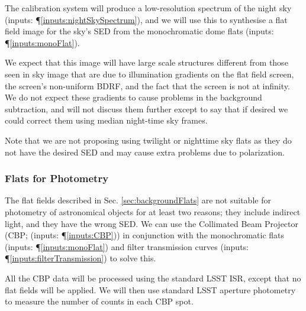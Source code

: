 \documentclass[12pt]{article}
\newcommand{\inputData}[1]{(inputs: \P \ref{inputs:#1})}
\newcommand{\secRef}[1]{Sec. \ref{sec:#1}}
\begin{document}
The calibration system will produce a low-resolution spectrum of the night sky \inputData{nightSkySpectrum},
and we will use this to synthesise a flat field image for the sky's SED from the monochromatic dome flats
\inputData{monoFlat}.

We expect that this image will have large scale structures different from those seen in sky image
that are due to illumination gradients on the flat field screen, the screen's non-uniform BDRF, and
the fact that the screen is not at infinity.  We do not expect these gradients to cause problems in
the background subtraction, and will not discuss them further except to say that if desired we could
correct them using median night-time sky frames.

Note that we are not proposing using twilight or nighttime sky flats as they do not have the desired
SED and may cause extra problems due to polarization.

\subsubsection{Flats for Photometry}
\label{sec:photometricFlats}

The flat fields described in \secRef{backgroundFlats} are not suitable for photometry of astronomical
objects for at least two reasons;  they include indirect light, and they have the wrong SED.  We can
use the Collimated Beam Projector (CBP; \inputData{CBP}) in conjunction with the monochromatic flats
\inputData{monoFlat} and filter transmission curves \inputData{filterTransmission} to solve this.

All the CBP data will be processed using the standard LSST ISR, except that no flat fields will be applied.
We will then use standard LSST aperture photometry to measure the number of counts in each CBP spot.
\end{document}
